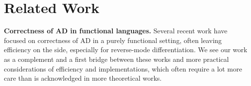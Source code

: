 

\section{Related Work} %
\label{sec:related_work}

\noindent \textbf{Correctness of AD in functional languages.}
Several recent work \cite{huot2020correctness,vakar2020reverse,vakar2020denotational,brunel2019backpropagation,barthe2020versatility,mazza2021automatic,lee2020correctness} have focused on correctness of AD in a purely functional setting, 
often leaving efficiency on the side, especially for reverse-mode differentiation. 
We see our work as a complement and a first bridge between these works 
and more practical considerations of efficiency and implementations, 
which often require a lot more care than is acknowledged in more theoretical works.


